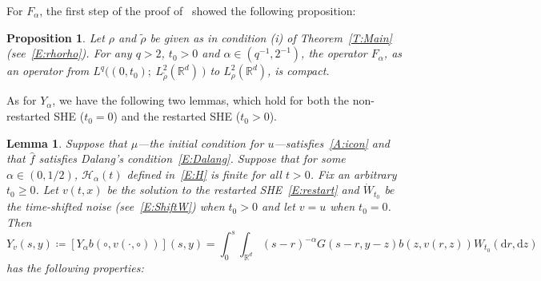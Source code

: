 \documentclass[a4paper,11pt]{article}%
\theoremstyle{plain}
\newtheorem{lemma}[theorem]{Lemma}
\newtheorem{proposition}[theorem]{Proposition}
\theoremstyle{definition}
\numberwithin{equation}{section}
\newcommand{\R}{\mathbb{R}}
\newcommand{\ud}{\ensuremath{\mathrm{d}}}
\begin{document}
For $F_\alpha$, the first step of the proof of~\cite[Theorem 3.1]{tessitore.zabczyk:98:invariant}
showed the following proposition:
\begin{proposition}\label{P:F-Comp}
  Let $\rho$ and $\tilde{\rho}$ be given as in condition (i) of Theorem~\ref{T:Main}
  (see~\eqref{E:rhorho}). For any $q>2$, $t_0>0$ and $\alpha \in (q^{-1},2^{-1})$, the operator
  $F_\alpha$, as an operator from $L^q\big((0,t_0);\: L^2_{\tilde{\rho}}(\R^d)\: \big)$ to
  $L^2_\rho(\R^d)$, is compact.
\end{proposition}

As for $Y_\alpha$, we have the following two lemmas, which hold for both the non-restarted SHE
($t_0 = 0$) and the restarted SHE ($t_0 > 0$).

\begin{lemma}\label{L:yineq}
  Suppose that $\mu$---the initial condition for $u$---satisfies~\eqref{A:icon} and that
  $\widehat{f}$ satisfies Dalang's condition~\eqref{E:Dalang}. Suppose that for some $\alpha\in
  (0,1/2)$, $\mathcal{H}_\alpha(t)$ defined in~\eqref{E:H} is finite for all $t>0$. Fix an arbitrary
  $t_0\ge 0$. Let $v(t,x)$ be the solution to the restarted SHE~\eqref{E:restart} and
  $\dot{W}_{t_0}$ be the time-shifted noise (see~\eqref{E:ShiftW}) when $t_0>0$ and let $v = u$ when
  $t_0 = 0$. Then
  \begin{equation}\label{E:Y}
     Y_v(s,y) \coloneqq \left[Y_\alpha b\left(\circ, v(\cdot,\circ)\right)\right](s,y)
               = \int_0^s \int_{\R^d} (s-r)^{-\alpha}G(s-r,y-z)b(z,v(r,z))W_{t_0}(\ud r,\ud z)
  \end{equation}
  has the following properties:


\end{lemma}
\end{document}
